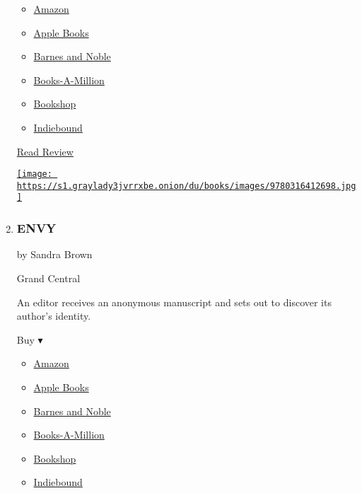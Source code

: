 \begin{enumerate}
  \begin{itemize}
  \tightlist
  \item
    \href{https://www.amazon.com/President-Missing-Novel-James-Patterson/dp/0316412694?tag=NYTBS-20}{Amazon}
  \item
    \href{https://du-gae-books-dot-nyt-du-prd.appspot.com/buy?title=THE+PRESIDENT+IS+MISSING\&author=James+Patterson+and+Bill+Clinton}{Apple
    Books}
  \item
    \href{https://www.anrdoezrs.net/click-7990613-11819508?url=https\%3A\%2F\%2Fwww.barnesandnoble.com\%2Fw\%2F\%3Fean\%3D9781538713846}{Barnes
    and Noble}
  \item
    \href{https://www.anrdoezrs.net/click-7990613-35140?url=https\%3A\%2F\%2Fwww.booksamillion.com\%2Fp\%2FTHE\%2BPRESIDENT\%2BIS\%2BMISSING\%2FJames\%2BPatterson\%2Band\%2BBill\%2BClinton\%2F9781538713846}{Books-A-Million}
  \item
    \href{https://bookshop.org/a/3546/9781538713846}{Bookshop}
  \item
    \href{https://www.indiebound.org/book/9781538713846?aff=NYT}{Indiebound}
  \end{itemize}

  \href{https://www.nytimes3xbfgragh.onion/2018/06/05/books/review/president-is-missing-clinton-patterson.html}{Read
  Review}

  \href{https://www.nytimes3xbfgragh.onion/2018/06/05/books/review/president-is-missing-clinton-patterson.html}{\texttt{[image: https://s1.graylady3jvrrxbe.onion/du/books/images/9780316412698.jpg]}}
\item
  \hypertarget{envy}{%
  \subsubsection{ENVY}\label{envy}}

  by Sandra Brown

  Grand Central

  An editor receives an anonymous manuscript and sets out to discover
  its author's identity.

  Buy ▾

  \begin{itemize}
  \tightlist
  \item
    \href{http://www.amazon.com/Envy-Sandra-Brown-ebook/dp/B00BEK703U?tag=NYTBS-20}{Amazon}
  \item
    \href{https://du-gae-books-dot-nyt-du-prd.appspot.com/buy?title=ENVY\&author=Sandra+Brown}{Apple
    Books}
  \item
    \href{https://www.anrdoezrs.net/click-7990613-11819508?url=https\%3A\%2F\%2Fwww.barnesandnoble.com\%2Fw\%2F\%3Fean\%3D9781538734100}{Barnes
    and Noble}
  \item
    \href{https://www.anrdoezrs.net/click-7990613-35140?url=https\%3A\%2F\%2Fwww.booksamillion.com\%2Fp\%2FENVY\%2FSandra\%2BBrown\%2F9781538734100}{Books-A-Million}
  \item
    \href{https://bookshop.org/a/3546/9781538734100}{Bookshop}
  \item
    \href{https://www.indiebound.org/book/9781538734100?aff=NYT}{Indiebound}
  \end{itemize}


\end{enumerate}
